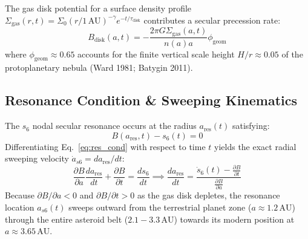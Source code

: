 \documentclass[11pt,a4paper]{article}
\begin{document}
The gas disk potential for a surface density profile $\Sigma_{\text{gas}}(r, t) = \Sigma_0 (r / 1\,\text{AU})^{-\gamma} e^{-t/\tau_{\text{disk}}}$ contributes a secular precession rate:
\begin{equation}
B_{\text{disk}}(a, t) = -\frac{2\pi G \Sigma_{\text{gas}}(a, t)}{n(a) a} \phi_{\text{geom}}
\label{eq:B_disk}
\end{equation}
where $\phi_{\text{geom}} \approx 0.65$ accounts for the finite vertical scale height $H/r \approx 0.05$ of the protoplanetary nebula (Ward 1981; Batygin 2011).

\subsection{Resonance Condition \& Sweeping Kinematics}
The $s_6$ nodal secular resonance occurs at the radius $a_{\text{res}}(t)$ satisfying:
\begin{equation}
B(a_{\text{res}}, t) - s_6(t) = 0
\label{eq:res_cond}
\end{equation}
Differentiating Eq.~\eqref{eq:res_cond} with respect to time $t$ yields the exact radial sweeping velocity $\dot{a}_{s6} = da_{\text{res}}/dt$:
\begin{equation}
\frac{\partial B}{\partial a} \frac{da_{\text{res}}}{dt} + \frac{\partial B}{\partial t} = \frac{ds_6}{dt} \implies \frac{da_{\text{res}}}{dt} = \frac{\dot{s}_6(t) - \frac{\partial B}{\partial t}}{\frac{\partial B}{\partial a}}
\label{eq:da_dt}
\end{equation}
Because $\partial B/\partial a < 0$ and $\partial B/\partial t > 0$ as the gas disk depletes, the resonance location $a_{s6}(t)$ sweeps outward from the terrestrial planet zone ($a \approx 1.2\,\text{AU}$) through the entire asteroid belt ($2.1 - 3.3\,\text{AU}$) towards its modern position at $a \approx 3.65\,\text{AU}$.
\end{document}
